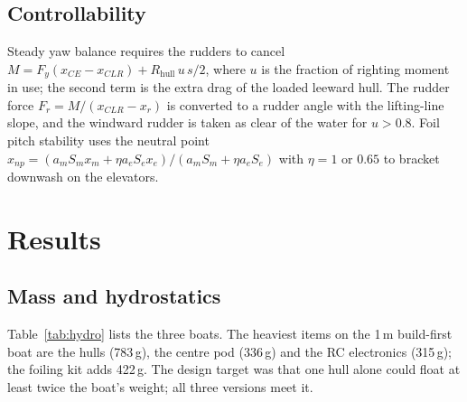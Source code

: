 \documentclass[10pt,twocolumn]{article}
\begin{document}
\subsection{Controllability}
Steady yaw balance requires the rudders to cancel $M=F_y(x_{CE}-x_{CLR})+R_{\text{hull}}\,u\,s/2$, where $u$ is the fraction of righting moment in use; the second term is the extra drag of the loaded leeward hull. The rudder force $F_r=M/(x_{CLR}-x_r)$ is converted to a rudder angle with the lifting-line slope, and the windward rudder is taken as clear of the water for $u>0.8$. Foil pitch stability uses the neutral point $x_{np}=(a_mS_mx_m+\eta a_eS_ex_e)/(a_mS_m+\eta a_eS_e)$ with $\eta=1$ or $0.65$ to bracket downwash on the elevators.

\section{Results}\label{sec:results}
\subsection{Mass and hydrostatics}
\begin{table}[t]
\centering\small
\caption{Mass properties and hydrostatics.}
\label{tab:hydro}
\end{table}
Table~\ref{tab:hydro} lists the three boats. The heaviest items on the 1\,m build-first boat are the hulls (783\,g), the centre pod (336\,g) and the RC electronics (315\,g); the foiling kit adds 422\,g. The design target was that one hull alone could float at least twice the boat's weight; all three versions meet it.
\end{document}
